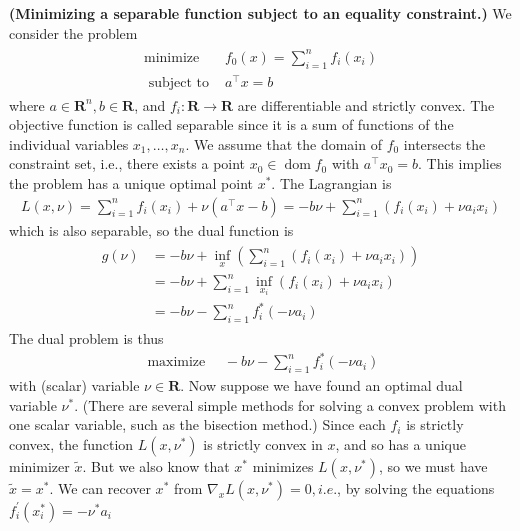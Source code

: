 \documentclass{article}
\newcommand{\bfs}[1]{\textbf{({#1}) }}
\begin{document}
\begin{exma}\bfs{Minimizing a separable function subject to an equality constraint.}
We consider the problem
\begin{align*}
\begin{array}{ll}
\operatorname{minimize} & f_{0}(x)=\sum_{i=1}^{n} f_{i}\left(x_{i}\right) \\
\text { subject to } & a^{\top} x=b
\end{array}
\end{align*}
where $a \in \mathbf{R}^{n}, b \in \mathbf{R}$, and $f_{i}: \mathbf{R} \rightarrow \mathbf{R}$ are differentiable and strictly convex. The objective function is called separable since it is a sum of functions of the individual variables $x_{1}, \ldots, x_{n} .$ We assume that the domain of $f_{0}$ intersects the constraint set, i.e., there exists a point $x_{0} \in \operatorname{dom} f_{0}$ with $a^{\top} x_{0}=b .$ This implies the problem has a unique optimal point $x^* $.
The Lagrangian is
\begin{align*}
L(x, \nu)=\sum_{i=1}^{n} f_{i}\left(x_{i}\right)+\nu\left(a^{\top} x-b\right)=-b \nu+\sum_{i=1}^{n}\left(f_{i}\left(x_{i}\right)+\nu a_{i} x_{i}\right)
\end{align*}
which is also separable, so the dual function is
\begin{align*}
\begin{aligned}
g(\nu) &=-b \nu+\inf _{x}\left(\sum_{i=1}^{n}\left(f_{i}\left(x_{i}\right)+\nu a_{i} x_{i}\right)\right) \\
&=-b \nu+\sum_{i=1}^{n} \inf _{x_{i}}\left(f_{i}\left(x_{i}\right)+\nu a_{i} x_{i}\right) \\
&=-b \nu-\sum_{i=1}^{n} f_{i}^{*}\left(-\nu a_{i}\right)
\end{aligned}
\end{align*}
The dual problem is thus
\begin{align*}
\text { maximize } \quad-b \nu-\sum_{i=1}^{n} f_{i}^{*}\left(-\nu a_{i}\right)
\end{align*}
with (scalar) variable $\nu \in \mathbf{R}$.
Now suppose we have found an optimal dual variable $\nu^*  .$ (There are several simple methods for solving a convex problem with one scalar variable, such as the bisection method.) Since each $f_{i}$ is strictly convex, the function $L\left(x, \nu^* \right)$ is strictly convex in $x$, and so has a unique minimizer $\tilde{x} .$ But we also know that $x^* $ minimizes $L\left(x, \nu^* \right)$, so we must have $\tilde{x}=x^*  .$ We can recover $x^* $ from $\nabla_{x} L\left(x, \nu^* \right)=0, i . e .$, by solving the equations $f_{i}^{\prime}\left(x_{i}^* \right)=-\nu^*  a_{i}$

\end{exma} 
\end{document}
